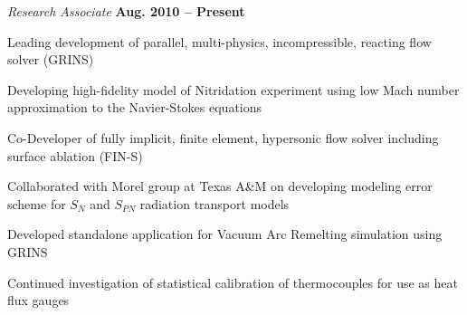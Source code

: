 \documentclass[12pt]{article}
\newenvironment{outerlist}[1][\enskip\textbullet]%
        {\begin{enumerate}[#1]}{\end{enumerate}%
         \vspace{-.6\baselineskip}}
\newenvironment{innerlist}[1][\enskip\textbullet]%
        {\begin{compactenum}[#1]}{\end{compactenum}}
\begin{document}
\begin{outerlist}
\item[] \textit{Research Associate} \hfill \textbf{Aug. 2010 -- Present}
\begin{innerlist}
\item Leading development of parallel, multi-physics, incompressible, reacting flow solver (GRINS)
\item Developing high-fidelity model of Nitridation experiment using low Mach number approximation to the 
Navier-Stokes equations
\item Co-Developer of fully implicit, finite element, hypersonic flow solver including surface ablation (FIN-S)
\item Collaborated with Morel group at Texas A\&M on developing modeling error scheme for $S_N$ and $S_{PN}$
radiation transport models
\item Developed standalone application for Vacuum Arc Remelting simulation using GRINS
\item Continued investigation of statistical calibration of thermocouples for use as heat flux gauges

\end{innerlist}
\end{outerlist}
\end{document}
